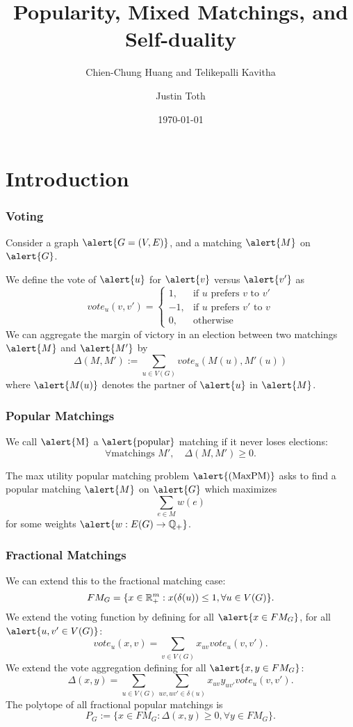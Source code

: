 \documentclass[10pt]{beamer}
\title{Popularity, Mixed Matchings, and Self-duality}
\subtitle{Chien-Chung Huang and Telikepalli Kavitha}
\date{\today}
\author{Justin Toth}
\institute{University of Waterloo}
\newcommand{\Q}{\mathbb{Q}}
\begin{document}
\maketitle

\section{Introduction}

\begin{frame}
\frametitle{Voting}
Consider a graph $\alert{G = (V,E)}$, and a matching $\alert{M}$ on $\alert{G}$.

We define the vote of $\alert{u}$ for $\alert{v}$ versus $\alert{v'}$ as
$$vote_u(v,v') = \begin{cases}
1, &\text{if $u$ prefers $v$ to $v'$} \\
-1, &\text{if $u$ prefers $v'$ to $v$} \\
0, &\text{otherwise}
\end{cases}
$$
We can aggregate the margin of victory in an election between two matchings $\alert{M}$ and $\alert{M'}$ by
$$\Delta(M,M') := \sum_{u \in V(G)} vote_u(M(u), M'(u)) $$
where $\alert{M(u)}$ denotes the partner of $\alert{u}$ in $\alert{M}$.
\end{frame}

\begin{frame}
\frametitle{Popular Matchings}
We call $\text{\alert{M}}$ a $\text{\alert{popular}}$ matching if it never loses elections:
$$\forall \text{matchings } M', \quad \Delta(M,M') \geq 0.$$


The max utility popular matching problem $\text{\alert{(MaxPM)}}$ asks to find a popular matching $\alert{M}$ on $\alert{G}$ which maximizes
$$\sum_{e\in M} w(e)$$
for some weights $\alert{ w: E(G) \rightarrow \Q_+}$.
\end{frame}

\begin{frame}
\frametitle{Fractional Matchings}
We can extend this to the fractional matching case:
$$FM_{G} = \{x \in \mathbb{R}^m_+ : x(\delta(u)) \leq 1, \forall u \in V(G)\}.$$
We extend the voting function by defining for all $\alert{x \in FM_G}$, for all $\alert{u,v' \in V(G)}$:
$$vote_u(x,v) = \sum_{v\in V(G)} x_{uv} vote_u(v,v').$$ 
We extend the vote aggregation defining for all $\alert{x, y \in FM_{G}}$:
$$\Delta(x,y) = \sum_{u \in V(G)} \sum_{uv, uv' \in \delta(u)} x_{uv}y_{uv'} vote_u(v,v').$$
The polytope of all fractional popular matchings is 
$$P_G := \{x \in FM_{G}: \Delta(x,y) \geq 0, \forall y \in FM_G\}.$$
\end{frame}
\end{document}
